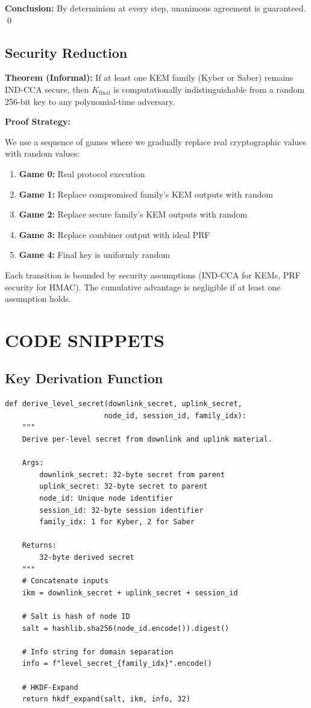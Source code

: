 \documentclass[12pt,a4paper]{report}
\begin{document}
\textbf{Conclusion:} By determinism at every step, unanimous agreement is guaranteed. \qed

\section{Security Reduction}

\textbf{Theorem (Informal):} If at least one KEM family (Kyber or Saber) remains IND-CCA secure, then $K_{\text{final}}$ is computationally indistinguishable from a random 256-bit key to any polynomial-time adversary.

\textbf{Proof Strategy:}

We use a sequence of games where we gradually replace real cryptographic values with random values:

\begin{enumerate}
\item \textbf{Game 0:} Real protocol execution
\item \textbf{Game 1:} Replace compromised family's KEM outputs with random
\item \textbf{Game 2:} Replace secure family's KEM outputs with random
\item \textbf{Game 3:} Replace combiner output with ideal PRF
\item \textbf{Game 4:} Final key is uniformly random
\end{enumerate}

Each transition is bounded by security assumptions (IND-CCA for KEMs, PRF security for HMAC). The cumulative advantage is negligible if at least one assumption holds.

\chapter{CODE SNIPPETS}

\section{Key Derivation Function}

\begin{verbatim}
def derive_level_secret(downlink_secret, uplink_secret, 
                       node_id, session_id, family_idx):
    """
    Derive per-level secret from downlink and uplink material.
    
    Args:
        downlink_secret: 32-byte secret from parent
        uplink_secret: 32-byte secret to parent
        node_id: Unique node identifier
        session_id: 32-byte session identifier
        family_idx: 1 for Kyber, 2 for Saber
    
    Returns:
        32-byte derived secret
    """
    # Concatenate inputs
    ikm = downlink_secret + uplink_secret + session_id
    
    # Salt is hash of node ID
    salt = hashlib.sha256(node_id.encode()).digest()
    
    # Info string for domain separation
    info = f"level_secret_{family_idx}".encode()
    
    # HKDF-Expand
    return hkdf_expand(salt, ikm, info, 32)
\end{verbatim}
\end{document}
